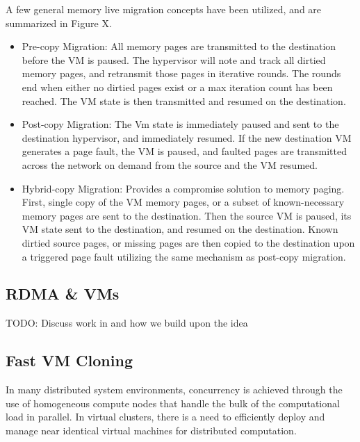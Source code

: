 A few general memory live migration concepts have been utilized, and are summarized in Figure X. 

\begin{itemize}
\item Pre-copy Migration:  All memory pages are transmitted to the destination before the VM is paused. The hypervisor will note and track all dirtied memory pages, and retransmit those pages in iterative rounds. The rounds end when either no dirtied pages exist or a max iteration count has been reached. The VM state is then transmitted and resumed on the destination. 
\item Post-copy Migration: The Vm state is immediately paused and sent to the destination hypervisor, and immediately resumed. If the new destination VM generates a page fault, the VM is paused, and faulted pages are transmitted across the network on demand from the source and the VM resumed.  
\item Hybrid-copy Migration: Provides a compromise solution to memory paging. First, single copy of the VM memory pages, or a subset of known-necessary memory pages are sent to the destination.  Then the source VM is paused, its VM state sent to the destination, and resumed on the destination.  Known dirtied source pages, or missing pages are then copied to the destination upon a triggered page fault utilizing the same mechanism as post-copy migration. 
\end{itemize}


\subsection{RDMA \& VMs}

TODO: Discuss work in \cite{huang2007high} and how we build upon the idea


\subsection{Fast VM Cloning}

In many distributed system environments, concurrency is achieved through the use of homogeneous compute nodes that handle the bulk of the computational load in parallel. In virtual clusters, there is a need to efficiently deploy and manage near identical virtual machines for distributed computation. 

